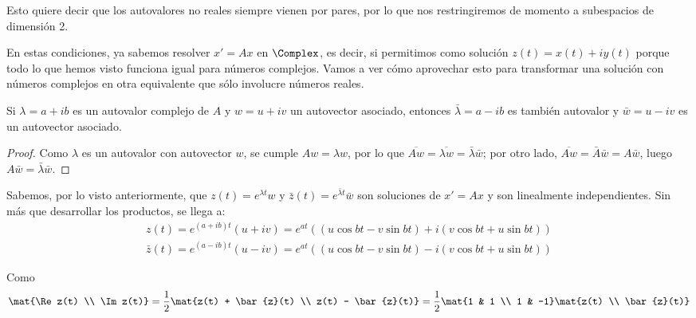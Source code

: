 \documentclass[../ecuaciones_diferenciales.tex]{subfiles}
\begin{document}
\begin{remark}
	Esto quiere decir que los autovalores no reales siempre vienen por pares,
	por lo que nos restringiremos de momento a subespacios de dimensión 2.
\end{remark}

\begin{remark}
	En estas condiciones, ya sabemos resolver \(x' = Ax\) en \(\Complex\), es
	decir, si permitimos como solución \(z(t) = x(t) + iy(t)\) porque todo lo
	que hemos visto funciona igual para números complejos. Vamos a ver cómo
	aprovechar esto para transformar una solución con números complejos en otra
	equivalente que sólo involucre números reales.
\end{remark}

\begin{proposition}
	Si \(\lambda = a + ib\) es un autovalor complejo de \(A\) y \(w = u + iv\)
	un autovector asociado, entonces \(\bar{\lambda} = a - ib\) es también
	autovalor y \(\bar{w} = u - iv\) es un autovector asociado.
	\begin{proof}
		Como \(\lambda\) es un autovalor con autovector \(w\), se cumple
		\(Aw = \lambda w\), por lo que
		\(\overline{Aw} = \overline{\lambda w} = \bar{\lambda} \bar{w}\); por otro
		lado, \(\overline{Aw} = \bar{A} \bar{w} = A \bar{w}\), luego \(A \bar{w} =
		\bar{\lambda} \bar{w}\).
	\end{proof}
\end{proposition}

Sabemos, por lo visto anteriormente, que \(z(t) = e^{\lambda t} w\) y
\(\bar{z}(t) = e^{\bar{\lambda} t} \bar{w}\) son soluciones de \(x' = Ax\) y
son linealmente independientes. Sin más que desarrollar los productos, se
llega a:
\begin{gather*}
	z(t) = e^{(a+ib)t} (u+iv) = e^{at}\left( (u\cos bt - v\sin bt) + i(v\cos bt + u\sin bt) \right) \\
	\bar{z}(t) = e^{(a-ib)t} (u-iv) = e^{at}\left( (u\cos bt - v\sin bt) - i(v\cos bt + u\sin bt) \right)
\end{gather*}

Como
\[\mat{\Re z(t) \\ \Im z(t)} = \frac{1}{2} \mat{z(t) + \bar{z}(t) \\
		z(t) - \bar{z}(t)} = \frac{1}{2}\mat{1 & 1 \\ 1 & -1}\mat{z(t) \\
		\bar{z}(t)} \]
\end{document}
